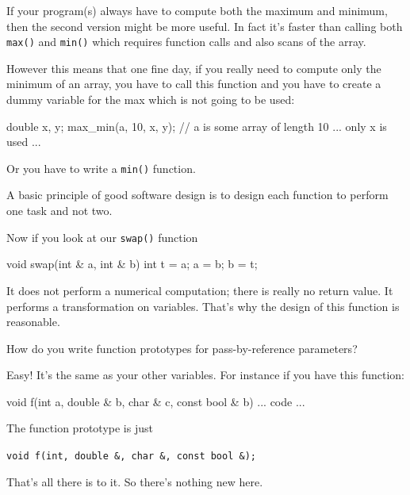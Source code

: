 If your program(s) always have to compute both the maximum and minimum, then the second version might be more useful. In fact it's faster than calling both \texttt{max()} and \texttt{min()} which requires  function calls and also  scans of the array.

However this means that one fine day, if you really need to compute only the minimum of an array, you have to call this function and you have to create a dummy variable for the max which is not going to be used:

\begin{consolethree}[escapeinside=||]
double x, y;
max_min(a, 10, x, y); // a is some array of length 10
... only x is used ...
\end{consolethree}

Or you have to write a \texttt{min()} function.

A basic principle of good software design is to design each function to perform one task and not two.

Now if you look at our \texttt{swap()} function

\begin{consolethree}[escapeinside=||]
void swap(int & a, int & b)
{
    int t = a;
    a = b;
    b = t;
}
\end{consolethree}

It does not perform a numerical computation; there is really no return value. It performs a transformation on variables. That's why the design of this function is reasonable.


\newpage{}

How do you write function prototypes for pass-by-reference parameters?

Easy! It's the same as your other variables. For instance if you have this function:

\begin{consolethree}[escapeinside=||]
void f(int a, double & b, char & c, const bool & b)
{
    ... code ...
}
\end{consolethree}

The function prototype is just

\verb!void f(int, double &, char &, const bool &);!

That's all there is to it. So there's
nothing new here.



